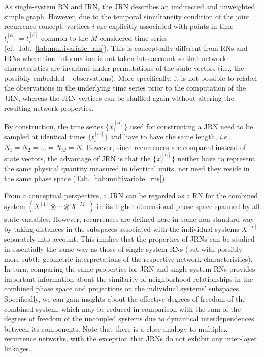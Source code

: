 		As single-system RN and IRN, the JRN describes an undirected and unweighted simple graph. However, due to the temporal simultaneity condition of the joint recurrence concept, vertices $i$ are explicitly associated with points in time $t^{[\alpha]}_i=t^{[\beta]}_i$ common to the $M$ considered time series (cf.~Tab.~\ref{tab:multivariate_rns}). This is conceptually different from RNs and IRNs where time information is not taken into account so that network characteristics are invariant under permutations of the state vectors (i.e., the -- possibily embedded -- observations). More specifically, it is not possible to relabel the observations in the underlying time series prior to the computation of the JRN, whereas the JRN vertices can be shuffled again without altering the resulting network properties.

		By construction, the time series $\{\vec{x}_i^{[\alpha]}\}$ used for constructing a JRN need to be sampled at identical times $\{t^{[\alpha]}_i\}$ and have to have the same length, \textit{i.e.}, $N_1=N_2=\dots=N_M=N$. However, since recurrences are compared instead of state vectors, the advantage of JRN is that the $\{\vec{x}_i^{[\alpha]}\}$ neither have to represent the same physical quantity measured in identical units, nor need they reside in the same phase space (Tab.~\ref{tab:multivariate_rns}).

		From a conceptual perspective, a JRN can be regarded as a RN for the combined system $(X^{[1]}\otimes\cdots\otimes X^{[M]})$ in its higher-dimensional phase space spanned by all state variables. However, recurrences are defined here in some non-standard way by taking distances in the subspaces associated with the individual systems $X^{[\alpha]}$ separately into account. This implies that the properties of JRNs can be studied in essentially the same way as those of single-system RNs (but with possibly more subtle geometric interpretations of the respective network characteristics). In turn, comparing the same properties for JRN and single-system RNs provides important information about the similarity of neighborhood relationships in the combined phase space and projections on the individual systems' subspaces. Specifically, we can gain insights about the effective degrees of freedom of the combined system, which may be reduced in comparison with the sum of the degrees of freedom of the uncoupled systems due to dynamical interdependences between its components. Note that there is a close analogy to multiplex recurrence networks, with the exception that JRNs do not exhibit any inter-layer linkages.

